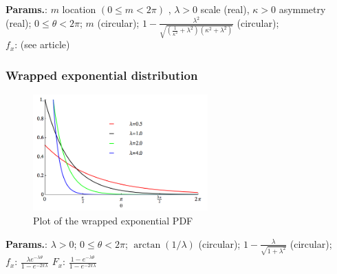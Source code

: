     {\color{darkblue} \textbf{Params.}:} {$m$ location $( 0 \le m < 2 \pi )$ ,  $\lambda > 0$ scale (real),  $\kappa > 0$ asymmetry (real)}; {$0\le\theta<2\pi$}; {$m$ (circular)}; {$1-\frac{\lambda ^2}{\sqrt{\left(\frac{1}{\kappa ^2}+\lambda^2 \right) \left(\kappa ^2+\lambda ^2\right)}}$ (circular)};\hspace{0.5cm}\\{\color{darkblue} \textbf{$f_x$}:} {(see article)}



    
        
\subsubsection{Wrapped exponential distribution}


    \begin{figure}[H]
        \centering
        \includegraphics[width=0.6\textwidth]{images/WrappedExponentialPDF.png}
        \caption{Plot of the wrapped exponential PDF}
    \end{figure}




    {\color{darkblue} \textbf{Params.}:} {$\lambda>0$}; {$0\le\theta<2\pi$}; {$\arctan(1/\lambda)$ (circular)}; {$1-\frac{\lambda}{\sqrt{1+\lambda^2}}$ (circular)};\hspace{0.5cm}\\{\color{darkblue} \textbf{$f_x$}:} {$\frac{\lambda e^{-\lambda \theta}}{1-e^{-2\pi \lambda}}$}{\color{darkblue} \textbf{$F_x$}:} {$\frac{1-e^{-\lambda \theta}}{1-e^{-2\pi \lambda}}$}



